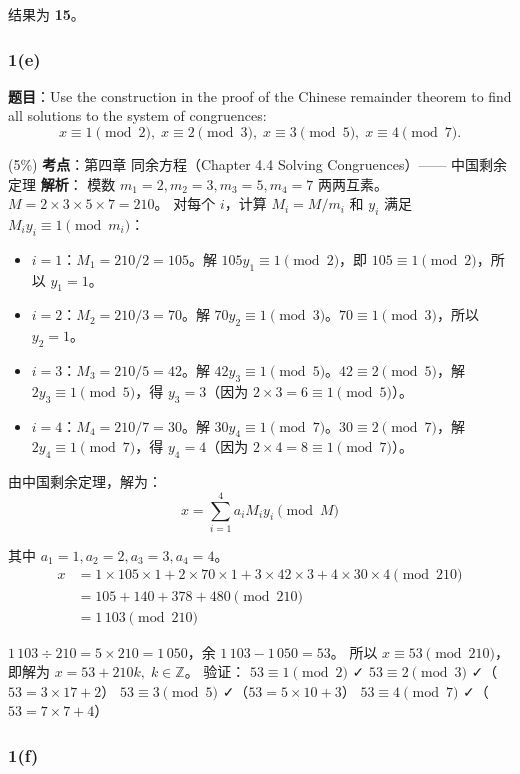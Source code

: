 \documentclass[10pt,a4paper,openany]{ctexbook}
\theoremstyle{definition}
\theoremstyle{remark}
\begin{document}
结果为 \textbf{15}。
\subsubsection{1(e)}

\textbf{题目}：Use the construction in the proof of the Chinese remainder theorem to find all solutions to the system of congruences:
\[
x \equiv 1 \pmod{2},\; x \equiv 2 \pmod{3},\; x \equiv 3 \pmod{5},\; x \equiv 4 \pmod{7}.
\]

(5\%)
\textbf{考点}：第四章 同余方程（Chapter 4.4 Solving Congruences）—— 中国剩余定理
\textbf{解析}：
模数 $m_1=2, m_2=3, m_3=5, m_4=7$ 两两互素。
$M = 2 \times 3 \times 5 \times 7 = 210$。
对每个 $i$，计算 $M_i = M / m_i$ 和 $y_i$ 满足 $M_i y_i \equiv 1 \pmod{m_i}$：
\begin{itemize}
\item $i=1$：$M_1 = 210/2 = 105$。解 $105 y_1 \equiv 1 \pmod{2}$，即 $105 \equiv 1 \pmod{2}$，所以 $y_1 = 1$。
\item $i=2$：$M_2 = 210/3 = 70$。解 $70 y_2 \equiv 1 \pmod{3}$。$70 \equiv 1 \pmod{3}$，所以 $y_2 = 1$。
\item $i=3$：$M_3 = 210/5 = 42$。解 $42 y_3 \equiv 1 \pmod{5}$。$42 \equiv 2 \pmod{5}$，解 $2y_3 \equiv 1 \pmod{5}$，得 $y_3 = 3$（因为 $2 \times 3 = 6 \equiv 1 \pmod{5}$）。
\item $i=4$：$M_4 = 210/7 = 30$。解 $30 y_4 \equiv 1 \pmod{7}$。$30 \equiv 2 \pmod{7}$，解 $2y_4 \equiv 1 \pmod{7}$，得 $y_4 = 4$（因为 $2 \times 4 = 8 \equiv 1 \pmod{7}$）。

\end{itemize}

由中国剩余定理，解为：
\[
x = \sum_{i=1}^{4} a_i M_i y_i \pmod{M}
\]

其中 $a_1=1, a_2=2, a_3=3, a_4=4$。
\[
\begin{aligned}
x &= 1 \times 105 \times 1 + 2 \times 70 \times 1 + 3 \times 42 \times 3 + 4 \times 30 \times 4 \pmod{210} \\
&= 105 + 140 + 378 + 480 \pmod{210} \\
&= 1\,103 \pmod{210}
\end{aligned}
\]

$1\,103 \div 210 = 5 \times 210 = 1\,050$，余 $1\,103 - 1\,050 = 53$。
所以 $x \equiv 53 \pmod{210}$，即解为 $x = 53 + 210k,\; k \in \mathbb{Z}$。
验证：
$53 \equiv 1 \pmod{2}$ ✓
$53 \equiv 2 \pmod{3}$ ✓（$53 = 3 \times 17 + 2$）
$53 \equiv 3 \pmod{5}$ ✓（$53 = 5 \times 10 + 3$）
$53 \equiv 4 \pmod{7}$ ✓（$53 = 7 \times 7 + 4$）
\subsubsection{1(f)}
\end{document}
